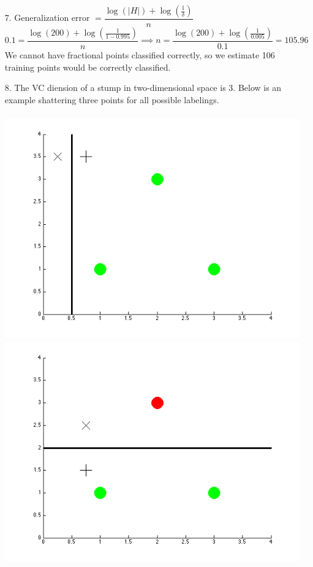 \documentclass{article}
\begin{document}
\begin{enumerate}
\bigskip

\item[7.]
	Generalization error $= \dfrac{\log (|H|) + \log (\frac{1}{\delta})}{n}$\\

	$0.1 = \dfrac{\log (200) + \log (\frac{1}{1 - 0.995})}{n} \implies n = \dfrac{\log (200) + \log (\frac{1}{0.005})}{0.1} = 105.96$\\

	We cannot have fractional points classified correctly, so we estimate 106 training points would be correctly classified.
	
\newpage

\item[8.]	
	The VC diension of a stump in two-dimensional space is 3. Below is an example shattering three points for all possible labelings.\\
	\bigskip\\
	\includegraphics[scale=0.25]{../images/ggg} \hfill \includegraphics[scale=0.25]{../images/ggr}\\

\end{enumerate}
\end{document}
